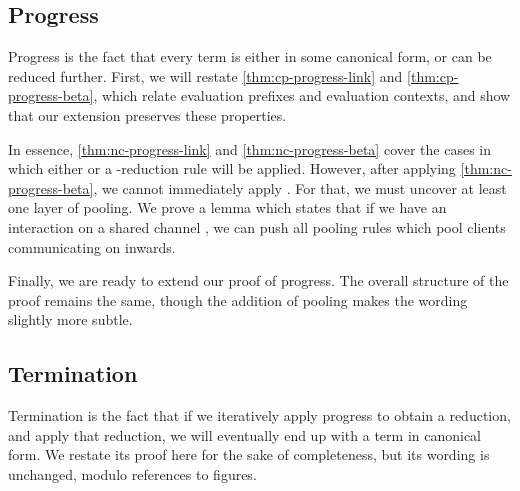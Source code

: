 \subsection{Progress}
Progress is the fact that every term is either in some canonical form, or can be
reduced further.
First, we will restate \cref{thm:cp-progress-link} and \cref{thm:cp-progress-beta},
which relate evaluation prefixes and evaluation contexts, and show that our
extension preserves these properties. 


In essence, \cref{thm:nc-progress-link} and \cref{thm:nc-progress-beta} cover
the cases in which either  or a \textbeta-reduction rule will be
applied.
However, after applying \cref{thm:nc-progress-beta}, we cannot immediately apply
. For that, we must uncover at least one layer of pooling.
We prove a lemma which states that if we have an interaction on a shared channel
, we can push all pooling rules which pool clients communicating on 
inwards. 

Finally, we are ready to extend our proof of progress. The overall structure of
the proof remains the same, though the addition of pooling makes the wording
slightly more subtle.


\subsection{Termination}
Termination is the fact that if we iteratively apply progress to obtain a
reduction, and apply that reduction, we will eventually end up with a term in
canonical form.
We restate its proof here for the sake of completeness, but its wording is
unchanged, modulo references to figures.


